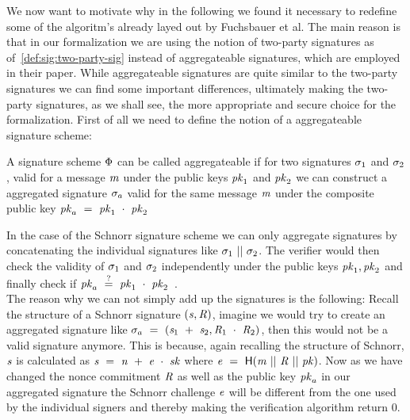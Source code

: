 We now want to motivate why in the following we found it necessary to redefine some of the algoritm's already layed out by Fuchsbauer et al.
The main reason is that in our formalization we are using the notion of two-party signatures as of~\cref{def:sig:two-party-sig} instead of aggregateable signatures, which are employed in their paper.
While aggregateable signatures are quite similar to the two-party signatures we can find some important differences, ultimately making the two-party signatures, as we shall see, the more appropriate and secure choice for the formalization.
First of all we need to define the notion of a aggregateable signature scheme:
\begin{definition} \label{def:atom:aggsig}
    A signature scheme $\Phi$ can be called aggregateable if for two signatures $\sigma_1$ and $\sigma_2$, valid for a message $\mathit{m}$ under the public keys $\mathit{pk}_1$ and $\mathit{pk}_2$ we can construct a aggregated signature $\sigma_a$ valid for the same message $\mathit{m}$ under the composite public key $\mathit{pk}_a ~=~ \mathit{pk}_1 ~\cdot~ \mathit{pk}_2$
\end{definition}
In the case of the Schnorr signature scheme we can only aggregate signatures by concatenating the individual signatures like $\sigma_1 ~||~ \sigma_2$.
The verifier would then check the validity of $\sigma_1$ and $\sigma_2$ independently under the public keys $\mathit{pk}_1, \mathit{pk}_2$ and finally check if $\mathit{pk}_a ~\stackrel{?}{=}~ \mathit{pk}_1 ~\cdot~ \mathit{pk}_2$~\cite{fuchsbauer2019aggregate}. \\
The reason why we can not simply add up the signatures is the following:
Recall the structure of a Schnorr signature $(\mathit{s}, \mathit{R})$, imagine we would try to create an aggregated signature like $\sigma_a ~=~ (\mathit{s}_1 ~+~ \mathit{s}_2, \mathit{R}_1 ~\cdot~ \mathit{R}_2)$, then this would not be a valid signature anymore.
This is because, again recalling the structure of Schnorr, $\mathit{s}$ is calculated as $\mathit{s} ~=~ \mathit{n} ~+~ \mathit{e} ~\cdot~ \mathit{sk}$ where $\mathit{e} ~=~ \mathsf{H} (\mathit{m} ~||~ \mathit{R} ~||~ \mathit{pk})$.
Now as we have changed the nonce commitment $\mathit{R}$ as well as the public key $\mathit{pk}_a$ in our aggregated signature the Schnorr challenge $\mathit{e}$ will be different from the one used by the individual signers and thereby making the verification algorithm return 0.
